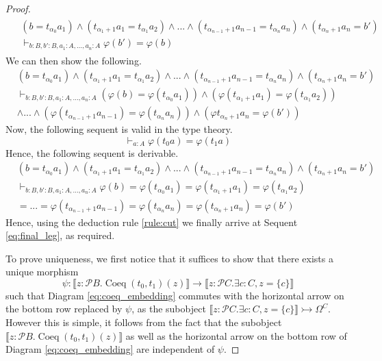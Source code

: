 \documentclass{tac}
\newcommand{\call}[1]{\mathcal{#1}}
\newcommand{\lto}{\longrightarrow}
\begin{document}
\begin{proof}
		\begin{align}\label{eq:final_leg}
			\begin{split}
				&(b = t_{\alpha_0}a_1) \wedge (t_{\alpha_1 + 1}a_1 = t_{\alpha_1}a_2) \wedge ... \wedge (t_{\alpha_{n-1}+1}a_{n-1} = t_{\alpha_{n}}a_{n}) \wedge (t_{\alpha_{n}+1}a_{n} = b') \\
				&\vdash_{b:B,b':B,a_1:A,...,a_n:A} \varphi(b') = \varphi(b)
				\end{split}
		\end{align}
		We can then show the following.
		\begin{align*}
			&(b = t_{\alpha_0}a_1) \wedge (t_{\alpha_1 + 1}a_1 = t_{\alpha_1}a_2) \wedge ... \wedge (t_{\alpha_{n-1}+1}a_{n-1} = t_{\alpha_{n}}a_{n}) \wedge (t_{\alpha_{n}+1}a_{n} = b') \\
			&\vdash_{b:B,b':B,a_1:A,...,a_n:A}
			(\varphi(b) = \varphi(t_{\alpha_0}a_1)) \wedge (\varphi(t_{\alpha_1 + 1}a_1) = \varphi (t_{\alpha_1}a_2))\\
			& \wedge ... \wedge (\varphi(t_{\alpha_{n-1}+1}a_{n-1}) = \varphi(t_{\alpha_{n}}a_{n})) \wedge (\varphi t_{\alpha_n + 1}a_n = \varphi(b'))
		\end{align*}
		Now, the following sequent is valid in the type theory.
		\begin{equation}
			\vdash_{a:A}\varphi (t_0 a) = \varphi (t_1 a)
		\end{equation}
		Hence, the following sequent is derivable.
		\begin{align*}
			&(b = t_{\alpha_0}a_1) \wedge (t_{\alpha_1 + 1}a_1 = t_{\alpha_1}a_2) \wedge ... \wedge (t_{\alpha_{n-1}+1}a_{n-1} = t_{\alpha_{n}}a_{n}) \wedge (t_{\alpha_{n}+1}a_{n} = b') \\
			&\vdash_{b:B,b':B,a_1:A,...,a_n:A}
			\varphi(b) = \varphi(t_{\alpha_0}a_1) = \varphi(t_{\alpha_1 + 1}a_1) = \varphi(t_{\alpha_1}a_2)\\
			& = ... = \varphi(t_{\alpha_{n-1}+1}a_{n-1}) = \varphi(t_{\alpha_{n}}a_{n}) = \varphi (t_{\alpha_n + 1}a_n) = \varphi(b')
		\end{align*}
		Hence, using the deduction rule \eqref{rule:cut} we finally arrive at Sequent \eqref{eq:final_leg}, as required.
		
		To prove uniqueness, we first notice that it suffices to show that there exists a unique morphism
		\begin{equation}
			\psi: \llbracket z: \call{P}B. \operatorname{Coeq}(t_0,t_1)(z)\rrbracket \lto \llbracket z: \call{P}C. \exists c:C, z = \lbrace c \rbrace \rrbracket
		\end{equation}
		such that Diagram \eqref{eq:coeq_embedding} commutes with the horizontal arrow on the bottom row replaced by $\psi$, as the subobject $\llbracket z: \call{P}C. \exists c:C, z = \lbrace c \rbrace\rrbracket \rightarrowtail \Omega^C$. However this is simple, it follows from the fact that the subobject $\llbracket z: \call{P}B. \operatorname{Coeq}(t_0,t_1)(z)\rrbracket$ as well as the horizontal arrow on the bottom row of Diagram \eqref{eq:coeq_embedding} are independent of $\psi$.
	\end{proof}
	
\end{document}
